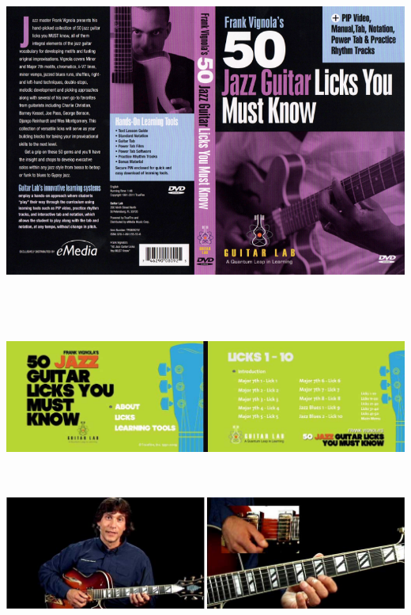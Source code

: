 \documentclass[a4paper]{book}
\begin{document}
\begin{center}
\includegraphics[width=17cm,height=11.435cm]{lebluessupportsmethodes-img90.jpg}
\end{center}


\begin{center}
\includegraphics[width=17cm,height=4.731cm]{lebluessupportsmethodes-img91.jpg}
\end{center}


\begin{center}
\includegraphics[width=17cm,height=4.747cm]{lebluessupportsmethodes-img92.jpg}
\end{center}
\end{document}
